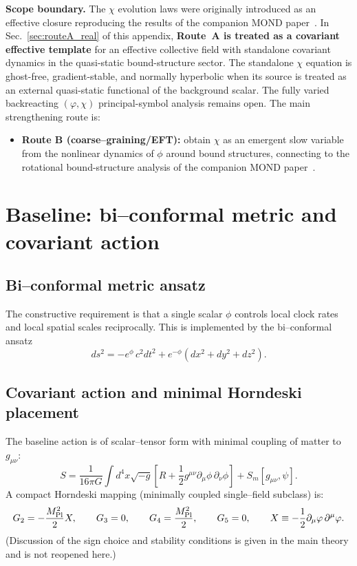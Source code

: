 \documentclass[11pt]{article}
\begin{document}
\textbf{Scope boundary.}
The $\chi$ evolution laws were originally introduced as
an effective closure reproducing the results of the companion MOND paper~\cite{Lotishvili2026MOND}.
In Sec.~\ref{sec:routeA_real} of this appendix,
\textbf{Route~A is treated as a covariant effective template}
for an effective collective field with standalone covariant
dynamics in the quasi-static bound-structure sector.  The
standalone $\chi$ equation is ghost-free, gradient-stable,
and normally hyperbolic when its source is treated as an
external quasi-static functional of the background scalar.
The fully varied backreacting $(\varphi,\chi)$ principal-symbol
analysis remains open.  The main strengthening route is:
\begin{itemize}
\item \textbf{Route B (coarse--graining/EFT):} obtain $\chi$ as an emergent slow variable from the nonlinear dynamics of $\phi$ around bound structures, connecting to the rotational bound-structure analysis of the companion MOND paper~\cite{Lotishvili2026MOND}.
\end{itemize}

\section{Baseline: bi--conformal metric and covariant action}\label{sec:base}
\subsection{Bi--conformal metric ansatz}
The constructive requirement is that a single scalar $\phi$ controls local clock rates and local spatial scales reciprocally. This is implemented by the bi--conformal ansatz
\begin{equation}
ds^2 = -e^{\phi}\,c^2 dt^2 + e^{-\phi}\left(dx^2+dy^2+dz^2\right).
\label{eq:biconf_app13}
\end{equation}

\subsection{Covariant action and minimal Horndeski placement}
The baseline action is of scalar--tensor form with minimal coupling of matter to $g_{\mu\nu}$:
\begin{equation}
S=\frac{1}{16\pi G}\int d^4x\sqrt{-g}\left[R+\frac12 g^{\mu\nu}\partial_\mu\phi\,\partial_\nu\phi\right]+S_m[g_{\mu\nu},\psi].
\label{eq:action_app13}
\end{equation}
A compact Horndeski mapping (minimally coupled single--field subclass) is:
\begin{equation}
G_2 = -\frac{M_{\rm Pl}^2}{2}X,\qquad
G_3=0,\qquad
G_4=\frac{M_{\rm Pl}^2}{2},\qquad
G_5=0,\qquad
X\equiv -\frac12 \partial_\mu\phi\,\partial^\mu\phi.
\label{eq:horndeski_app13}
\end{equation}
(Discussion of the sign choice and stability conditions is given in the main theory and is not reopened here.)
\end{document}

